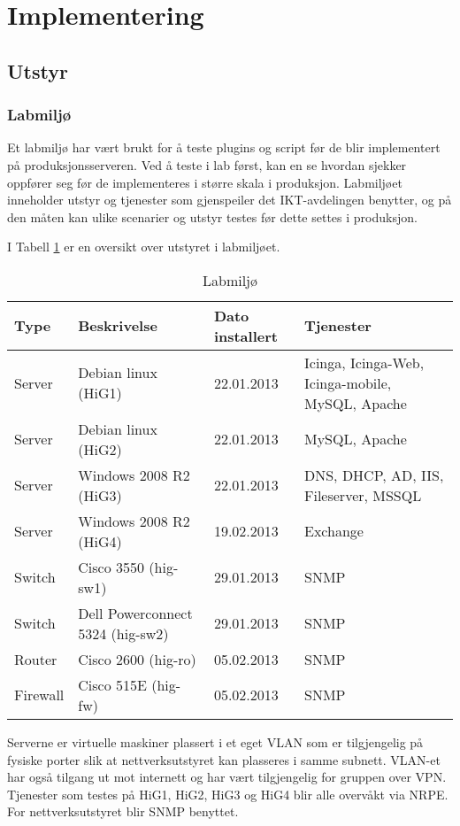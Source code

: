 \section{Implementering}
\subsection{Utstyr}
\subsubsection{Labmiljø}
Et labmiljø har vært brukt for å teste plugins og script før de blir implementert på produksjonsserveren. Ved å teste i lab først, kan en se hvordan sjekker oppfører seg før de implementeres i større skala i produksjon. Labmiljøet inneholder utstyr og tjenester som gjenspeiler det IKT-avdelingen benytter, og på den måten kan ulike scenarier og utstyr testes før dette settes i produksjon.

I Tabell \ref{labmiljo} er en oversikt over utstyret i labmiljøet.
\begin{changemargin}{-1cm}{-1cm}
\begin{table}
\begin{center}
\begin{tabular}{ | l | l | l | p{4cm} |} \hline
	\textbf{Type} & \textbf{Beskrivelse} & \textbf{Dato installert} & \textbf{Tjenester} \\ \hline
	Server & Debian linux (HiG1) & 22.01.2013 & Icinga, Icinga-Web, Icinga-mobile, MySQL, Apache \\ \hline
	Server & Debian linux (HiG2) & 22.01.2013 &	MySQL, Apache \\ \hline
	Server & Windows 2008 R2 (HiG3) & 22.01.2013 & DNS, DHCP, AD, IIS, Fileserver, MSSQL \\ \hline
	Server & Windows 2008 R2 (HiG4) & 19.02.2013 & Exchange \\ \hline 
	Switch & Cisco 3550 (hig-sw1) &	29.01.2013 & SNMP \\ \hline
	Switch & Dell Powerconnect 5324 (hig-sw2) & 29.01.2013 & SNMP \\ \hline
	Router & Cisco 2600 (hig-ro) & 05.02.2013 & SNMP \\ \hline 
	Firewall & Cisco 515E (hig-fw) & 05.02.2013 & SNMP \\ \hline
\end{tabular}
\caption{Labmiljø}
\label{labmiljo}
\end{center}
\end{table}
\end{changemargin}
Serverne er virtuelle maskiner plassert i et eget VLAN som er tilgjengelig på fysiske porter slik at nettverksutstyret kan plasseres i samme subnett. VLAN-et har også tilgang ut mot internett og har vært tilgjengelig for gruppen over VPN. Tjenester som testes på HiG1, HiG2, HiG3 og HiG4 blir alle overvåkt via NRPE. For nettverksutstyret blir SNMP benyttet.

